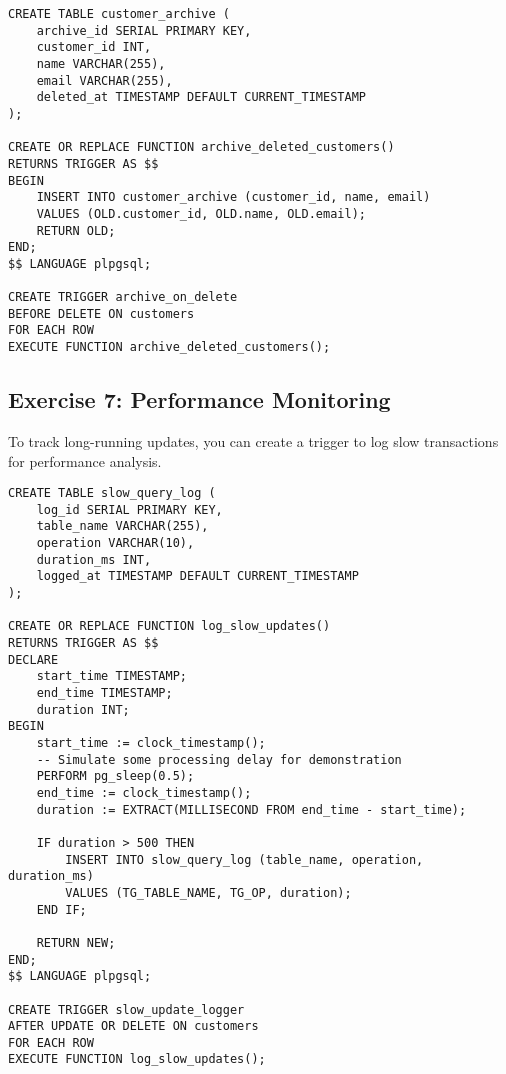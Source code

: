 \documentclass{article}
\begin{document}
\begin{verbatim}
CREATE TABLE customer_archive (
    archive_id SERIAL PRIMARY KEY,
    customer_id INT,
    name VARCHAR(255),
    email VARCHAR(255),
    deleted_at TIMESTAMP DEFAULT CURRENT_TIMESTAMP
);

CREATE OR REPLACE FUNCTION archive_deleted_customers()
RETURNS TRIGGER AS $$
BEGIN
    INSERT INTO customer_archive (customer_id, name, email)
    VALUES (OLD.customer_id, OLD.name, OLD.email);
    RETURN OLD;
END;
$$ LANGUAGE plpgsql;

CREATE TRIGGER archive_on_delete
BEFORE DELETE ON customers
FOR EACH ROW
EXECUTE FUNCTION archive_deleted_customers();
\end{verbatim}

\subsection*{Exercise 7: Performance Monitoring}
To track long-running updates, you can create a trigger to log slow transactions for performance analysis.

\begin{verbatim}
CREATE TABLE slow_query_log (
    log_id SERIAL PRIMARY KEY,
    table_name VARCHAR(255),
    operation VARCHAR(10),
    duration_ms INT,
    logged_at TIMESTAMP DEFAULT CURRENT_TIMESTAMP
);

CREATE OR REPLACE FUNCTION log_slow_updates()
RETURNS TRIGGER AS $$
DECLARE
    start_time TIMESTAMP;
    end_time TIMESTAMP;
    duration INT;
BEGIN
    start_time := clock_timestamp();
    -- Simulate some processing delay for demonstration
    PERFORM pg_sleep(0.5);
    end_time := clock_timestamp();
    duration := EXTRACT(MILLISECOND FROM end_time - start_time);

    IF duration > 500 THEN
        INSERT INTO slow_query_log (table_name, operation, duration_ms)
        VALUES (TG_TABLE_NAME, TG_OP, duration);
    END IF;

    RETURN NEW;
END;
$$ LANGUAGE plpgsql;

CREATE TRIGGER slow_update_logger
AFTER UPDATE OR DELETE ON customers
FOR EACH ROW
EXECUTE FUNCTION log_slow_updates();
\end{verbatim}

\end{document}
